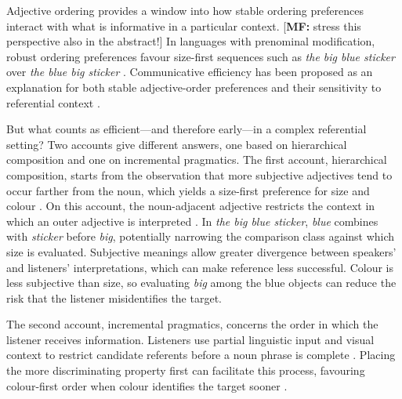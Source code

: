 \documentclass[10pt,a4paper,fleqn]{article}
\newcommand{\mf}[1]{\textcolor{shimmer-main}{[\textbf{MF: }{#1}]}}
\begin{document}
Adjective ordering provides a window into how stable ordering preferences interact with what is informative in a particular context. \mf{stress this perspective also in the abstract!}
In languages with prenominal modification, robust ordering preferences favour size-first sequences such as \emph{the big blue sticker} over \emph{the blue big sticker} \citep{sproat1991,trotzke2019,scontras2023adjective}.
Communicative efficiency has been proposed as an explanation for both stable adjective-order preferences and their sensitivity to referential context \citep{scontras2017subjectivity,franke2019subjectivity,Hahn_information_2018,futrell-etal-2020-determines}.

\label{sec:bg:subjectivity}
But what counts as efficient---and therefore early---in a complex referential setting?
Two accounts give different answers, one based on hierarchical composition and one on incremental pragmatics.
The first account, hierarchical composition, starts from the observation that more subjective adjectives tend to occur farther from the noun, which yields a size-first preference for size and colour \citep{scontras2017subjectivity,trainin2021s}.
On this account, the noun-adjacent adjective restricts the context in which an outer adjective is interpreted \citep{franke2019subjectivity,scontras2019grammatical,scontras2020incremental}.
In \emph{the big blue sticker}, \emph{blue} combines with \emph{sticker} before \emph{big}, potentially narrowing the comparison class against which size is evaluated.
Subjective meanings allow greater divergence between speakers' and listeners' interpretations, which can make reference less successful.
Colour is less subjective than size, so evaluating \emph{big} among the blue objects can reduce the risk that the listener misidentifies the target.

The second account, incremental pragmatics, concerns the order in which the listener receives information.
Listeners use partial linguistic input and visual context to restrict candidate referents before a noun phrase is complete \citep{tanenhaus1995integration,sedivy1999achieving}.
Placing the more discriminating property first can facilitate this process, favouring colour-first order when colour identifies the target sooner \citep{fukumura2018ordering,rubio2020incrementality,rubio2021wordorder}.
\end{document}
